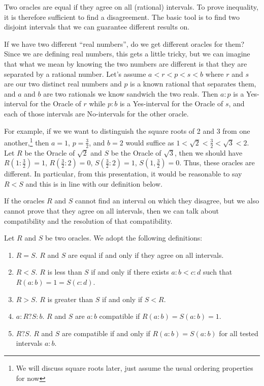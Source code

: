 \documentclass[12pt]{article}
\theoremstyle{remark}
\begin{document}
Two oracles are equal if they agree on all (rational) intervals. To prove inequality, it is therefore sufficient to find a disagreement. The basic tool is to find two disjoint intervals that we can guarantee different results on. 

If we have two different ``real numbers'', do we get different oracles for them? Since we are defining real numbers, this gets a little tricky, but we can imagine that what we mean by knowing the two numbers are different is that they are separated by a rational number. Let's assume $a < r < p < s < b$ where $r$ and $s$ are our two distinct real numbers and $p$ is a known rational that separates them, and $a$ and $b$ are two rationals we know sandwich the two reals. Then $a:p$ is a Yes-interval for the Oracle of $r$ while $p:b$ is a Yes-interval for the Oracle of $s$, and each of those intervals are No-intervals for the other oracle. 

For example, if we we want to distinguish the square roots of 2 and 3 from one another,\footnote{We will discuss square roots later, just assume the usual ordering properties for now} then $a = 1$, $p = \tfrac{3}{2}$, and $b = 2$ would suffice as $1 < \sqrt{2} < \tfrac{3}{2} < \sqrt{3} < 2$. Let $R$ be the Oracle of $\sqrt{2}$ and $S$ be the Oracle of $\sqrt{3}$, then we should have $R(1:\tfrac{3}{2}) = 1$, $R(\tfrac{3}{2}:2) = 0$,  $S(\tfrac{3}{2}:2) = 1$, $S(1, \tfrac{3}{2}) = 0$. Thus, these oracles are different. In particular, from this presentation, it would be reasonable to say $R < S$ and this is in line with our definition below.

If the oracles $R$ and $S$ cannot find an interval on which they disagree, but we also cannot prove that they agree on all intervals, then we can talk about compatibility and the resolution of that compatibility.

Let $R$ and $S$ be two oracles. We adopt the following definitions:

\begin{enumerate}
    \item $R=S$. $R$ and $S$ are equal if and only if they agree on all intervals. 
    \item $R < S$. $R$ is less than $S$ if and only if there exists $a:b < c:d$ such that $R(a:b) =1 = S(c:d)$. 
    \item $R > S$. $R$ is greater than $S$ if and only if $S < R$.
    \item $a:R?S:b$. $R$ and $S$ are $a:b$ compatible if $R(a:b)=S(a:b) = 1$.
    \item $R ? S$. $R$ and $S$ are compatible if and only if $R(a:b) = S(a:b)$ for all tested intervals $a:b$. 
\end{enumerate}
\end{document}
